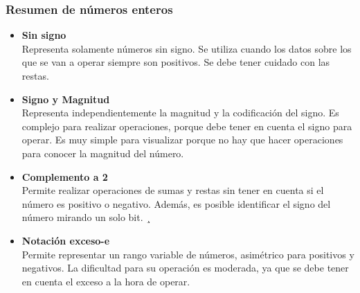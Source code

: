 \documentclass[aspectratio=169]{beamer}
\begin{document}
\begin{frame}[fragile]
    \frametitle{Resumen de números enteros}
    \begin{itemize}
    \item \textbf{Sin signo}\\ Representa solamente números sin signo. Se utiliza cuando los datos sobre los que se van a operar siempre son positivos. Se debe tener cuidado con las restas.
    \pause
    \item \textbf{Signo y Magnitud}\\ Representa independientemente la magnitud y la codificación del signo. Es complejo para realizar operaciones, porque debe tener en cuenta el signo para operar. Es muy simple para visualizar porque no hay que hacer operaciones para conocer la magnitud del número.
    \pause
    \item \textbf{Complemento a 2}\\
    Permite realizar operaciones de sumas y restas sin tener en cuenta si el número es positivo o negativo. Además, es posible identificar el signo del número mirando un solo bit.
    \pause¸
    \item \textbf{Notación exceso-e}\\
    Permite representar un rango variable de números, asimétrico para positivos y negativos. La dificultad para su operación es moderada, ya que se debe tener en cuenta el exceso a la hora de operar.
    \end{itemize}
\end{frame}
\end{document}
